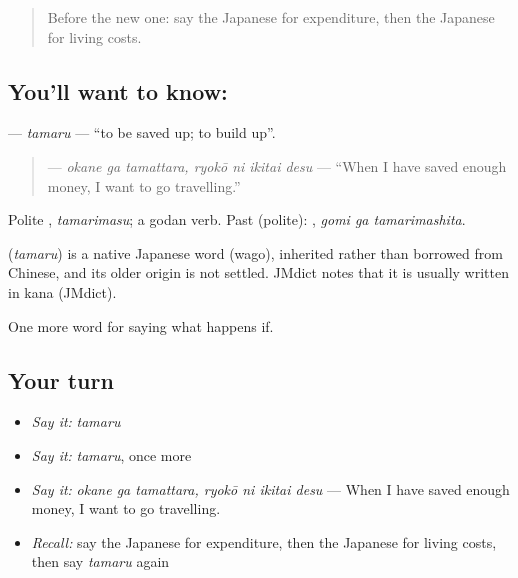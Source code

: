 \label{lesson:JA-C360-tamaru}



\begin{quote}
Before the new one: say the Japanese for expenditure, then the Japanese for living costs.
\end{quote}

\subsection*{You'll want to know: }
\textbf{} — \emph{tamaru} — \textquotedblleft{}to be saved up; to build up\textquotedblright{}.

\begin{quote}
\textbf{  } — \emph{okane ga tamattara, ryokō ni ikitai desu} — \textquotedblleft{}When I have saved enough money, I want to go travelling.\textquotedblright{}
\end{quote}

Polite \textbf{}, \emph{tamarimasu}; a godan verb. Past (polite): \textbf{ }, \emph{gomi ga tamarimashita}.

\begin{cousinweb}
\textbf{} (\emph{tamaru}) is a native Japanese word (wago), inherited rather than borrowed from Chinese, and its older origin is not settled. JMdict notes that it is usually written in kana (JMdict).
\end{cousinweb}

\begin{grammarlens}[title={What you've built}]
One more word for saying what happens if.
\end{grammarlens}

\subsection*{Your turn}
\begin{itemize}
\raggedright
  \item \emph{Say it:} \emph{tamaru}
  \item \emph{Say it:} \emph{tamaru}, once more
  \item \emph{Say it:} \emph{okane ga tamattara, ryokō ni ikitai desu} — When I have saved enough money, I want to go travelling.
  \item \emph{Recall:} say the Japanese for expenditure, then the Japanese for living costs, then say \emph{tamaru} again
\end{itemize}

